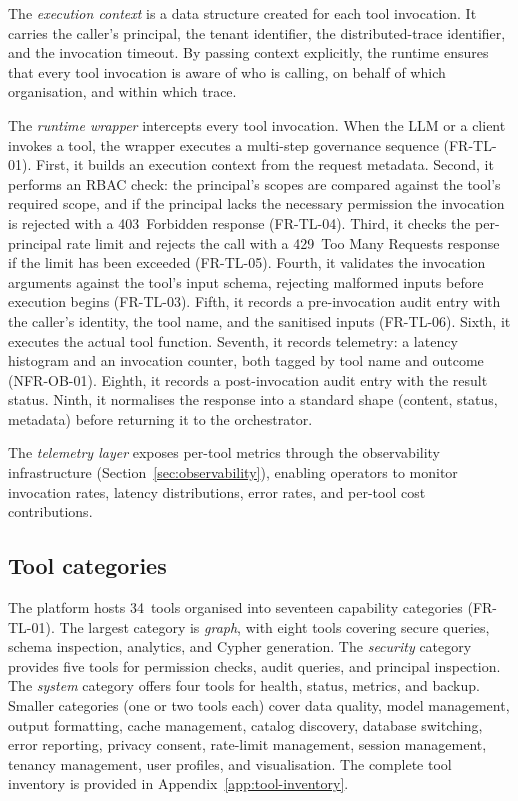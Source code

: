 \documentclass[a4paper]{sapthesis}
\begin{document}
The \emph{execution context} is a data structure created for each tool
invocation.  It carries the caller's principal, the tenant identifier, the
distributed-trace identifier, and the invocation timeout.  By passing
context explicitly, the runtime ensures that every tool invocation is
aware of who is calling, on behalf of which organisation, and within which
trace.

The \emph{runtime wrapper} intercepts every tool invocation.
When the LLM or a client invokes a tool, the wrapper executes a
multi-step governance sequence (FR-TL-01).  First, it builds an execution context from
the request metadata.  Second, it performs an RBAC check: the principal's
scopes are compared against the tool's required scope, and if the
principal lacks the necessary permission the invocation is rejected with a
403~Forbidden response (FR-TL-04).  Third, it checks the per-principal
rate limit and rejects the call with a 429~Too Many Requests response if
the limit has been exceeded (FR-TL-05).  Fourth, it validates the
invocation arguments against the tool's input schema, rejecting malformed
inputs before execution begins (FR-TL-03).  Fifth, it records a
pre-invocation audit entry with the caller's identity, the tool name, and
the sanitised inputs (FR-TL-06).  Sixth, it executes the actual tool
function.  Seventh, it records telemetry: a latency histogram and an
invocation counter, both tagged by tool name and outcome (NFR-OB-01).
Eighth, it records a post-invocation audit entry with the result status.
Ninth, it normalises the response into a standard shape (content, status,
metadata) before returning it to the orchestrator.

The \emph{telemetry layer} exposes per-tool metrics through the
observability infrastructure (Section~\ref{sec:observability}), enabling
operators to monitor invocation rates, latency distributions, error rates,
and per-tool cost contributions.

\subsection{Tool categories}

The platform hosts 34~tools organised into seventeen capability
categories (FR-TL-01).  The largest category is \emph{graph}, with eight
tools covering secure queries, schema inspection, analytics, and Cypher
generation.  The \emph{security} category provides five tools for
permission checks, audit queries, and principal inspection.  The
\emph{system} category offers four tools for health, status, metrics, and
backup.  Smaller categories (one or two tools each) cover data quality,
model management, output formatting, cache management, catalog discovery,
database switching, error reporting, privacy consent, rate-limit
management, session management, tenancy management, user profiles, and
visualisation.  The complete tool inventory is provided in
Appendix~\ref{app:tool-inventory}.
\end{document}
